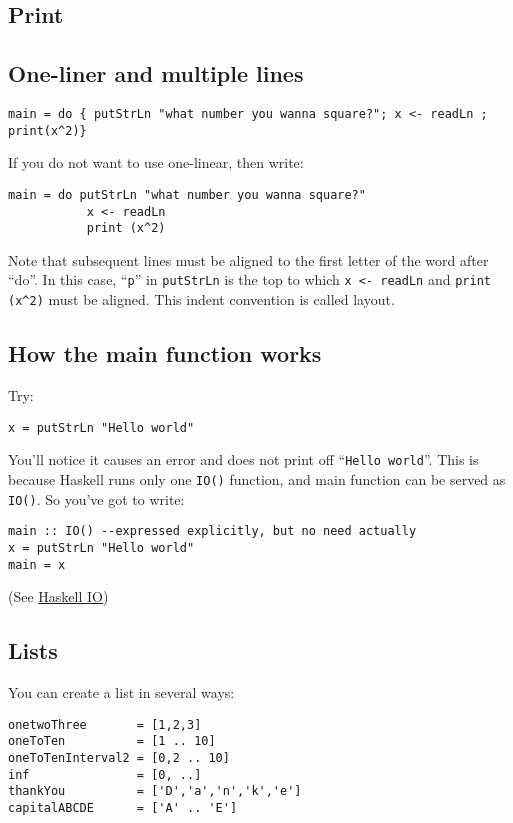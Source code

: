 \subsection{Print}

\subsection{One-liner and multiple lines}

\begin{lstlisting}
main = do { putStrLn "what number you wanna square?"; x <- readLn ;  print(x^2)} 
\end{lstlisting}

If you do not want to use one-linear, then write: 

\begin{lstlisting}
main = do putStrLn "what number you wanna square?" 
           x <- readLn
           print (x^2)
\end{lstlisting}
Note that subsequent lines must be aligned to the first letter of the word after “do”.
In this case, “\lstinline{p}” in \lstinline{putStrLn} is the top to which \lstinline{x <- readLn} and \lstinline{print (x^2)} must be aligned. 
This indent convention is called layout.

\subsection{How the main function works}
Try: 
\begin{lstlisting}
x = putStrLn "Hello world"
\end{lstlisting}

You’ll notice it causes an error and does not print off “\lstinline{Hello world}”. 
This is because Haskell runs only one \lstinline{IO()} function, and main function can be served as \lstinline{IO()}. 
So you’ve got to write:

\begin{lstlisting}
main :: IO() --expressed explicitly, but no need actually 
x = putStrLn "Hello world"
main = x 
\end{lstlisting}
(See \href{https://wiki.haskell.org/Introduction_to_Haskell_IO/Actions}{Haskell IO})

\subsection{Lists}
You can create a list in several ways:
\begin{lstlisting}
onetwoThree       = [1,2,3]
oneToTen          = [1 .. 10]
oneToTenInterval2 = [0,2 .. 10]
inf               = [0, ..]
thankYou          = ['D','a','n','k','e']
capitalABCDE      = ['A' .. 'E']
\end{lstlisting}

